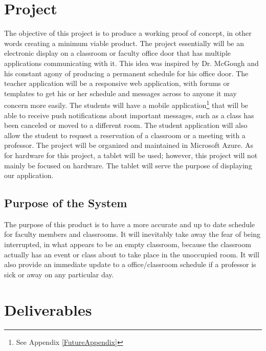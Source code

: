 \section{Project}
The objective of this project is to produce a working proof of concept, in other words creating a minimum viable product. The project essentially will be an electronic display on a classroom or faculty office door that has multiple applications communicating with it.   This idea was inspired by Dr. McGough and his constant agony of producing a permanent schedule for his office door. The teacher application will be a responsive web application, with forums or templates to get his or her schedule and messages across to anyone it may concern more easily. The students will have a mobile application\footnote{See Appendix \ref{FutureAppendix}} that will be able to receive push notifications about important messages, such as a class has been canceled or moved to a different room.  The student application will also allow the student to request a reservation of a classroom or a meeting with a professor. The project will be organized and maintained in Microsoft Azure. As for hardware for this project, a tablet will be used; however, this project will not mainly be focused on hardware. The tablet will serve the purpose of displaying our application. 

\subsection{Purpose of the System}
The purpose of this product is to have a more accurate and up to date schedule for faculty members and classrooms. It will inevitably take away the fear of being interrupted, in what appears to be an empty classroom, because the classroom actually has an event or class about to take place in the unoccupied room. It will also provide an immediate update to a office/classroom schedule  if a professor is sick or away on any particular day. 




\section{Deliverables}

